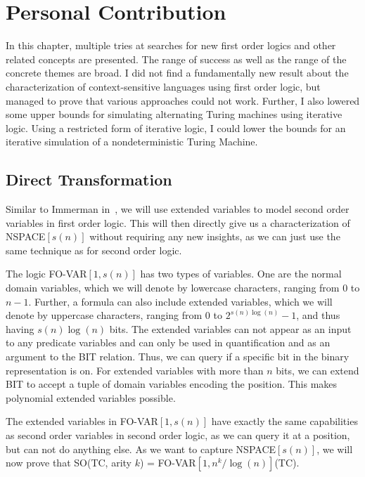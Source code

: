 \chapter{Personal Contribution}\label{ch:personal-contribution}

In this chapter, multiple tries at searches for new first order logics and other related concepts are presented.
The range of success as well as the range of the concrete themes are broad.
I did not find a fundamentally new result about the characterization of context-sensitive languages using first order logic, but managed to prove that various approaches could not work.
Further, I also lowered some upper bounds for simulating alternating Turing machines using iterative logic.
Using a restricted form of iterative logic, I could lower the bounds for an iterative simulation of a nondeterministic Turing Machine.

\section{Direct Transformation}\label{sec:direct-transformation}

Similar to Immerman in~\cite{descriptive-complexity}, we will use extended variables to model second order variables in first order logic.
This will then directly give us a characterization of NSPACE$[s(n)]$ without requiring any new insights, as we can just use the same technique as for second order logic.

\begin{define}
    The logic FO-VAR$[1, s(n)]$ has two types of variables.
    One are the normal domain variables, which we will denote by lowercase characters, ranging from $0$ to $n - 1$.
    Further, a formula can also include extended variables, which we will denote by uppercase characters, ranging from $0$ to $2^{s(n)\log(n)} - 1$, and thus having $s(n)\log(n)$ bits.
    The extended variables can not appear as an input to any predicate variables and can only be used in quantification and as an argument to the BIT relation.
    Thus, we can query if a specific bit in the binary representation is on.
    For extended variables with more than $n$ bits, we can extend BIT to accept a tuple of domain variables encoding the position.
    This makes polynomial extended variables possible.
\end{define}

The extended variables in FO-VAR$[1, s(n)]$ have exactly the same capabilities as second order variables in second order logic, as we can query it at a position, but can not do anything else.
As we want to capture NSPACE$[s(n)]$, we will now prove that SO(TC, arity $k$) = FO-VAR$[1, n^k/\log(n)]$(TC).

